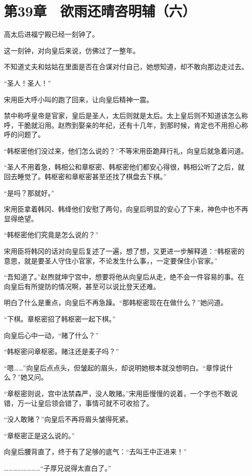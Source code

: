 \section{第39章　欲雨还晴咨明辅（六）}

高太后进福宁殿已经一刻钟了。

这一刻钟，对向皇后来说，仿佛过了一整年。

不知道丈夫和姑姑在里面是否在合谋对付自己，她想知道，却不敢向那边走过去。

“圣人！圣人！”

宋用臣大呼小叫的跑了回来，让向皇后精神一震。

禁中称呼皇帝是官家，皇后是圣人，太后则就是太后。太上皇后则不知道该怎么称呼，干脆就沿用。赵煦到娶亲的年纪，还有十几年，到那时候，肯定也不用担心称呼的问题了。

“韩枢密他们没过来，他们怎么说的？”不等宋用臣跪拜行礼，向皇后就急着问道。

“圣人不用着急，韩相公和章枢密、韩枢密他们都安心得很，韩相公听了之后，就回去睡觉了。韩枢密和章枢密甚至还找了棋盘去下棋。”

“是吗？那就好。”

宋用臣拿着韩冈、韩绛他们安慰了两句，向皇后明显的安心了下来，神色中也不再显得绝望。

“韩枢密他们究竟是怎么说的？”

宋用臣将韩冈的话对向皇后复述了一遍，想了想，又更进一步解释道：“韩枢密的意思，就是要圣人守住小官家，不论发生什么事，，一定要保住小官家。”

“吾知道了。”赵煦就坤宁宫中，想要将他从向皇后从走，绝不会一件容易的事。在向皇后有所提防的情况啊，甚至可以说比登天还难。

明白了什么是重点，向皇后不再急躁。“那韩枢密现在在做什么？”她问道。

“下棋。章枢密招了韩枢密一起下棋。”

向皇后心中一动，“赌了什么？”

“韩枢密问章枢密。赌注还是麦子吗？”

“嗯……”向皇后点点头，但皱起的眉头，却说明她根本就没想明白。“章惇说什么？”她又问。

“章枢密则说，宫中法禁森严，没人敢赌。”宋用臣慢慢的说着，一个字也不敢说错，万一让皇后领会错了，事情可就不可收拾了。

“没人敢赌？”向皇后不再将眉头皱得死紧。

“章枢密正是这么说的。”

向皇后腰背直了，终于有了足够的底气：“去叫王中正进来！”

……………………“子厚兄说得太直白了。”

